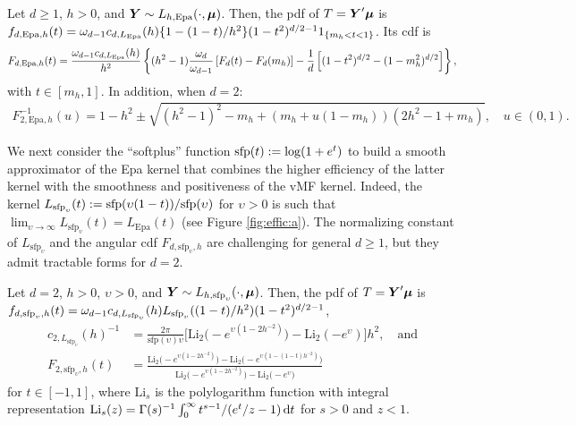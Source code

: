 \documentclass[oneside,11pt]{article}
\begin{document}
\begin{proposition}\label{prop:Epa2}
Let $d\geq 1$, $h>0$, and $\boldsymbol{Y}\sim L_{h,\mathrm{Epa}}(\cdot,\boldsymbol\mu)$. Then, the pdf of $T=\boldsymbol{Y}'\boldsymbol\mu$ is $f_{d,\mathrm{Epa},h}(t)=\omega_{d-1} c_{d,L_\mathrm{Epa}}(h)\{1-(1-t)/h^2\}(1-t^2)^{d/2-1}1_{\{m_h<t<1\}}$. Its cdf is \begin{align*}
    F_{d,\mathrm{Epa},h}(t)=\frac{\omega_{d-1} c_{d,L_\mathrm{Epa}}(h)}{h^2}\left\{(h^2-1)\frac{\omega_{d}}{\omega_{d-1}}\left[F_d(t)-F_d(m_h)\right]-\frac{1}{d}\left[(1-t^2)^{d/2} - (1-m_h^2)^{d/2}\right]\right\},
\end{align*}
with $t\in[m_h,1]$. In addition, when $d=2$:
\begin{align*}
    F^{-1}_{2,\mathrm{Epa},h}(u)=1-h^2\pm\sqrt{(h^2-1)^2-m_h+(m_h+u(1-m_h))(2h^2-1+m_h)},\quad u\in(0,1).
\end{align*}
\end{proposition}

We next consider the ``softplus'' function $\mathrm{sfp}(t):=\log(1+e^t)$ to build a smooth approximator of the Epa kernel that combines the higher efficiency of the latter kernel with the smoothness and positiveness of the vMF kernel. Indeed, the kernel $L_{\mathrm{sfp}_{\upsilon}}(t):= \mathrm{sfp}(\upsilon(1-t)) / \mathrm{sfp}(\upsilon)$ for $\upsilon>0$ is such that $\lim_{\upsilon\to\infty}L_{\mathrm{sfp}_\upsilon}(t)=L_{\mathrm{Epa}}(t)$ (see Figure \ref{fig:effic:a}). The normalizing constant of $L_{\mathrm{sfp}_\upsilon}$ and the angular cdf $F_{d,\mathrm{sfp}_\upsilon,h}$ are challenging for general $d\geq1$, but they admit tractable forms for $d=2$.

\begin{proposition}\label{prop:sp}
Let $d=2$, $h>0$, $\upsilon>0$, and $\boldsymbol{Y}\sim L_{h,\mathrm{sfp}_\upsilon}(\cdot,\boldsymbol\mu)$. Then, the pdf of $T=\boldsymbol{Y}'\boldsymbol\mu$ is $f_{d,\mathrm{sfp}_\upsilon,h}(t)=\omega_{d-1} c_{d,L_{\mathrm{sfp}_\upsilon}}(h)L_{\mathrm{sfp}_\upsilon}((1-t)/h^2) (1-t^2)^{d/2-1}$,
\begin{align*}
	c_{2,L_{\mathrm{sfp}_\upsilon}}(h)^{-1}&=\frac{2\pi}{\mathrm{sfp}(\upsilon)\upsilon}\Big[\mathrm{Li}_{2}\big(-e^{\upsilon(1-2h^{-2})}\big)-\mathrm{Li}_{2}(-e^{\upsilon})\Big]h^2,\quad \text{and}\\
	F_{2,\mathrm{sfp}_\upsilon,h}(t)&=\frac{\mathrm{Li}_2\big(-e^{\upsilon(1-2h^{-2})}\big)-\mathrm{Li}_2\big(-e^{\upsilon(1-(1-t)h^{-2})}\big)}{  \mathrm{Li}_2\big(-e^{\upsilon(1-2h^{-2})}\big)-\mathrm{Li}_2\big(-e^\upsilon\big)}
\end{align*}
for $t\in[-1,1]$, where $\mathrm{Li}_s$ is the polylogarithm function with integral representation $\mathrm{Li}_s(z)=\Gamma(s)^{-1}\allowbreak \int_{0}^{\infty} t^{s-1}/(e^t/z-1)\,\mathrm{d} t$ for $s>0$ and $z<1$.
\end{proposition}
\end{document}
